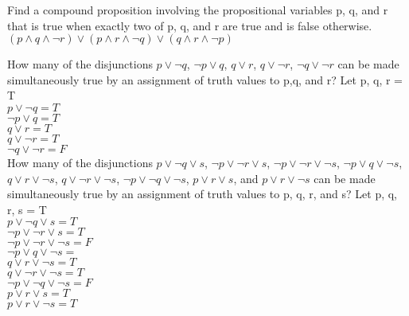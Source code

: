 \documentclass{article}
\let\lnot\neg
\begin{document}
{Find a compound proposition involving the propositional
variables p, q, and r that is true when exactly two of p, q,
and r are true and is false otherwise.}
{
  $(p \land q \land \neg r) \lor (p \land r \land \neg q) \lor (q \land r \land \neg p)$
}

{How many of the disjunctions $p \lor \lnot q$, $\lnot p \lor q$, $q \lor r$, $q \lor \lnot r$, $\lnot q \lor \lnot r$ can be made simultaneously true by an assignment of truth values to p,q, and r?}
{
  Let p, q, r = T\\
  $p \lor \lnot q = T$\\
  $\lnot p \lor q = T$\\
  $q \lor r = T$\\
  $q \lor \lnot r = T$\\
  $\lnot q \lor \lnot r = F$\\
}
{How many of the disjunctions $p \lor \lnot q\lor s$, $\lnot p\lor \lnot r\lor s$, $\lnot p\lor \lnot r\lor \lnot s$, $\lnot p\lor q\lor \lnot s$, $q\lor r\lor \lnot s$, $q\lor \lnot r\lor \lnot s$, $\lnot p\lor \lnot q\lor \lnot s$, $p\lor r\lor s$, and $p\lor r\lor \lnot s$ can  be  made  simultaneously  true  by  an  assignment  of truth values to p, q, r, and s?}
{
  Let p, q, r, s = T\\
  $p \lor \lnot q \lor s = T$\\
  $\lnot p\lor \lnot r\lor s = T$\\
  $\lnot p\lor \lnot r\lor \lnot s = F$\\
  $\lnot p\lor q\lor \lnot s = $\\
  $q\lor r\lor \lnot s = T$\\
  $q\lor \lnot r\lor \lnot s = T$\\
  $\lnot p\lor \lnot q\lor \lnot s = F$\\
  $p\lor r\lor s = T$\\
  $p\lor r\lor \lnot s = T$\\
}
\pagebreak
\end{document}
